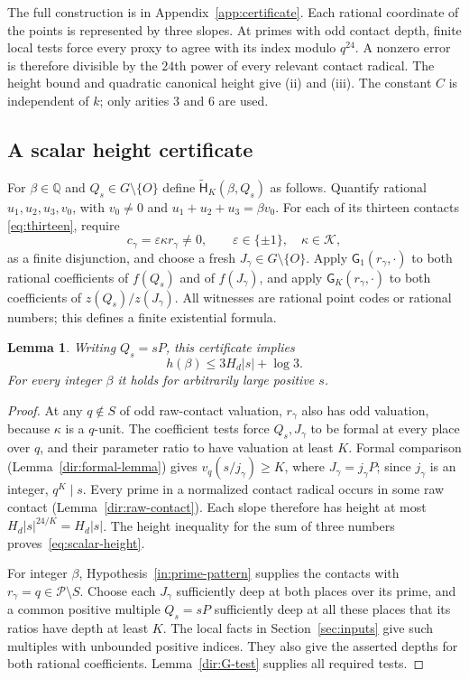 \documentclass[11pt]{article}
\newtheorem{lemma}[theorem]{Lemma}
\theoremstyle{definition}\newtheorem{inputthm}[theorem]{Hypothesis}
\theoremstyle{remark}\newtheorem{remark}[theorem]{Remark}
\newcommand{\Q}{\mathbb Q}\newcommand{\Z}{\mathbb Z}
\newcommand{\Htilde}{\widetilde{\mathsf H}}
\begin{document}
The full construction is in Appendix~\ref{app:certificate}.
Each rational coordinate of the points is represented by three slopes.
At primes with odd contact depth, finite local tests force every proxy
to agree with its index modulo $q^{24}$. A nonzero error is therefore
divisible by the $24$th power of every relevant contact radical.
The height bound and quadratic canonical height give (ii) and (iii).
The constant $C$ is independent of $k$; only arities $3$ and $6$ are used.

\subsection{A scalar height certificate}

For $\beta\in\Q$ and $Q_s\in G\setminus\{O\}$ define
$\Htilde_K(\beta,Q_s)$ as follows. Quantify rational
$u_1,u_2,u_3,v_0$, with $v_0\ne0$ and
$u_1+u_2+u_3=\beta v_0$. For each of its thirteen contacts
\eqref{eq:thirteen}, require
\[
 c_\gamma=\varepsilon\kappa r_\gamma\ne0,
 \qquad\varepsilon\in\{\pm1\},\quad\kappa\in\mathcal K,
\]
as a finite disjunction, and choose a fresh
$J_\gamma\in G\setminus\{O\}$. Apply $\mathsf G_1(r_\gamma,\cdot)$
to both rational coefficients of $f(Q_s)$ and of $f(J_\gamma)$,
and apply $\mathsf G_K(r_\gamma,\cdot)$ to both coefficients of
$z(Q_s)/z(J_\gamma)$. All witnesses are rational point codes or
rational numbers; this defines a finite existential formula.

\begin{lemma}\label{lem:scalar}
Writing $Q_s=sP$, this certificate implies
\begin{equation}\label{eq:scalar-height}
                   h(\beta)\le3H_d|s|+\log3.
\end{equation}
For every integer $\beta$ it holds for arbitrarily large positive $s$.
\end{lemma}
\begin{proof}
At any $q\notin S$ of odd raw-contact valuation, $r_\gamma$ also
has odd valuation, because $\kappa$ is a $q$-unit. The coefficient
tests force $Q_s,J_\gamma$ to be formal at every place over $q$,
and their parameter ratio to have valuation at least $K$.
Formal comparison (Lemma~\ref{dir:formal-lemma}) gives
$v_q(s/j_\gamma)\ge K$, where $J_\gamma=j_\gamma P$;
since $j_\gamma$ is an integer, $q^K\mid s$.
Every prime in a normalized contact radical occurs in some raw contact
(Lemma~\ref{dir:raw-contact}). Each slope therefore has height at most
$H_d|s|^{24/K}=H_d|s|$. The height inequality for the sum of three
numbers proves~\eqref{eq:scalar-height}.

For integer $\beta$, Hypothesis~\ref{in:prime-pattern} supplies the
contacts with $r_\gamma=q\in\mathscr P\setminus S$.
Choose each $J_\gamma$ sufficiently deep at both places over its prime,
and a common positive multiple $Q_s=sP$ sufficiently deep at all
these places that its ratios have depth at least $K$. The local facts
in Section~\ref{sec:inputs} give such multiples with unbounded positive
indices. They also give the asserted depths for both rational
coefficients. Lemma~\ref{dir:G-test} supplies all required tests.
\end{proof}
\end{document}

